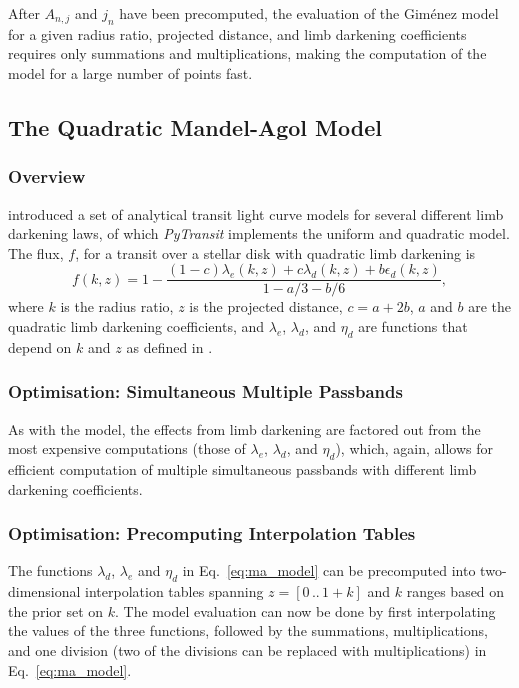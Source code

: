 \documentclass[usenatbib,usegraphicx,useAMS]{mn2e}
\newcommand{\pytransit}{\textit{PyTransit}\xspace}
\begin{document}
{After $A_{n,j}$ and $j_n$ have been precomputed, the evaluation of the Gim\'enez model for a given radius ratio, 
projected distance, and limb darkening coefficients requires only summations and multiplications, making the computation 
of the model for a large number of points fast. 


\subsection{The Quadratic Mandel-Agol Model}
\label{sec:ma}
\subsubsection{Overview}
\label{sec:ma:overview}
\citet{Mandel2002} introduced a set of analytical transit light curve models for several different limb darkening laws, 
of which \pytransit implements the uniform and quadratic model. The flux, $f$, for a transit over a stellar disk with 
quadratic limb darkening is 
\begin{equation}
 f(k,z) = 1 - \frac{(1-c)\lambda_e(k,z) + c\lambda_d(k,z) + b\epsilon_d(k,z)}{1-a/3-b/6}, \label{eq:ma_model}
\end{equation}
where $k$ is the radius ratio, $z$ is the projected distance, $c=a+2b$, $a$ and $b$ are the quadratic limb darkening 
coefficients, and $\lambda_e$, $\lambda_d$, and $\eta_d$ are functions that depend on $k$ and $z$ as defined in 
\citet{Mandel2002}.

\subsubsection{Optimisation: Simultaneous Multiple Passbands}
\label{sec:ma:multicolor}
As with the \citeauthor{Gimenez2006} model, the effects from limb darkening are factored out from the most expensive 
computations (those of $\lambda_e$, $\lambda_d$, and $\eta_d$), which, again, allows for efficient computation of 
multiple simultaneous passbands with different limb darkening coefficients.

\subsubsection{Optimisation: Precomputing Interpolation Tables}
\label{sec:ma:interpolation}
The functions $\lambda_d$, $\lambda_e$ and $\eta_d$ in Eq.~\ref{eq:ma_model} can be precomputed into two-dimensional 
interpolation tables spanning $z=[0\,..\,1+k]$ and $k$ ranges based on the prior set on $k$. The model evaluation can 
now be done by first interpolating the values of the three functions, followed by the summations, multiplications, and 
one division (two of the divisions can be replaced with multiplications) in Eq.~\ref{eq:ma_model}.

}
\end{document}
